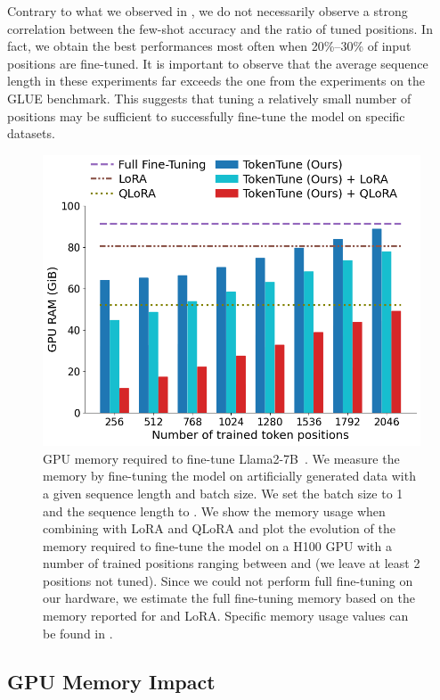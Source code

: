 Contrary to what we observed in , we do not necessarily observe a strong correlation between the few-shot accuracy and the ratio of tuned positions. 
In fact, we obtain the best performances most often when 20\%--30\% of input positions are fine-tuned. 
It is important to observe that the average sequence length in these experiments far exceeds the one from the experiments on the GLUE benchmark. This suggests that tuning a relatively small number of positions may be sufficient to successfully fine-tune the model on specific datasets. 

\begin{figure}[t]
\centering
     \includegraphics[width=1.0\linewidth]{figures/mem_llama_2.png}
\caption{GPU memory required to fine-tune Llama2-7B~\citep{touvron_23}. We measure the memory by fine-tuning the model on artificially generated data with a given sequence length and batch size. We set the batch size to 1 and the sequence length to . We show the memory usage when combining  \method with LoRA and QLoRA and plot the evolution of the memory required to fine-tune the model on a H100 GPU with a number of trained positions ranging between  and  (we leave at least 2 positions not tuned). 
    Since we could not perform full fine-tuning on our hardware, we estimate the full fine-tuning memory based on the memory reported for \method and LoRA.
    Specific memory usage values can be found in .}
    \label{fig:llm-memory}
\end{figure}

\subsection{GPU Memory Impact}
\label{sec:exp:large:gpu_memory}

